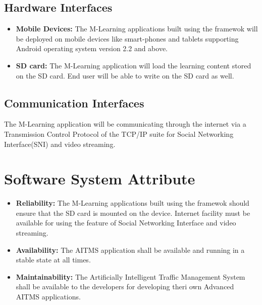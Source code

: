 \documentclass[openany,12pt]{report}
\begin{document}
\subsection{Hardware Interfaces}
\begin{itemize}
\item{\textbf{Mobile Devices:} The M-Learning applications built using the framewok will be deployed on mobile devices like smart-phones and tablets supporting Android operating system version 2.2 and above.}
\item{\textbf{SD card:}  The M-Learning application will load the learning content stored on the SD card. End user will be able to write on the SD card as well.}
\end{itemize}

\subsection{Communication Interfaces}
\hspace*{0.5in}The M-Learning application will be communicating through the internet via a Transmission Control Protocol of the TCP/IP suite for Social Networking Interface(SNI) and video streaming.

\section{Software System Attribute}
\begin{itemize}
\item{\textbf{Reliability:} The M-Learning applications built using the framewok should ensure that the SD card is mounted on the device. Internet facility must be available for using the feature of Social Networking Interface and video streaming.}
\item{\textbf{Availability:} The AITMS application shall be available and running in a stable state at all times.}
\item{\textbf{Maintainability:}  The Artificially Intelligent Traffic Management System shall be available to the developers for developing theri own Advanced AITMS applications.}

\end{itemize}
\end{document}
